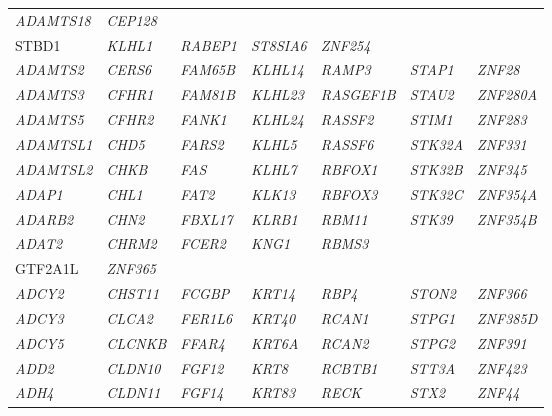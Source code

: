 \begin{refsection}
\begin{otherlanguage}{english}
\begin{scriptsize}
\begin{longtable}{lllllll}
\textit{ADAMTS18} & \textit{CEP128} & \textit{\begin{tabular}[c]{@{}l@{}}FAM47E-\\ STBD1\end{tabular}} & \textit{KLHL1} & \textit{RABEP1} & \textit{ST8SIA6} & \textit{ZNF254} \\
\textit{ADAMTS2} & \textit{CERS6} & \textit{FAM65B} & \textit{KLHL14} & \textit{RAMP3} & \textit{STAP1} & \textit{ZNF28} \\
\textit{ADAMTS3} & \textit{CFHR1} & \textit{FAM81B} & \textit{KLHL23} & \textit{RASGEF1B} & \textit{STAU2} & \textit{ZNF280A} \\
\textit{ADAMTS5} & \textit{CFHR2} & \textit{FANK1} & \textit{KLHL24} & \textit{RASSF2} & \textit{STIM1} & \textit{ZNF283} \\
\textit{ADAMTSL1} & \textit{CHD5} & \textit{FARS2} & \textit{KLHL5} & \textit{RASSF6} & \textit{STK32A} & \textit{ZNF331} \\
\textit{ADAMTSL2} & \textit{CHKB} & \textit{FAS} & \textit{KLHL7} & \textit{RBFOX1} & \textit{STK32B} & \textit{ZNF345} \\
\textit{ADAP1} & \textit{CHL1} & \textit{FAT2} & \textit{KLK13} & \textit{RBFOX3} & \textit{STK32C} & \textit{ZNF354A} \\
\textit{ADARB2} & \textit{CHN2} & \textit{FBXL17} & \textit{KLRB1} & \textit{RBM11} & \textit{STK39} & \textit{ZNF354B} \\
\textit{ADAT2} & \textit{CHRM2} & \textit{FCER2} & \textit{KNG1} & \textit{RBMS3} & \textit{\begin{tabular}[c]{@{}l@{}}STON1-\\ GTF2A1L\end{tabular}} & \textit{ZNF365} \\
\textit{ADCY2} & \textit{CHST11} & \textit{FCGBP} & \textit{KRT14} & \textit{RBP4} & \textit{STON2} & \textit{ZNF366} \\
\textit{ADCY3} & \textit{CLCA2} & \textit{FER1L6} & \textit{KRT40} & \textit{RCAN1} & \textit{STPG1} & \textit{ZNF385D} \\
\textit{ADCY5} & \textit{CLCNKB} & \textit{FFAR4} & \textit{KRT6A} & \textit{RCAN2} & \textit{STPG2} & \textit{ZNF391} \\
\textit{ADD2} & \textit{CLDN10} & \textit{FGF12} & \textit{KRT8} & \textit{RCBTB1} & \textit{STT3A} & \textit{ZNF423} \\
\textit{ADH4} & \textit{CLDN11} & \textit{FGF14} & \textit{KRT83} & \textit{RECK} & \textit{STX2} & \textit{ZNF44} \\

\end{longtable}
\end{scriptsize}
\end{otherlanguage}
\end{refsection}
